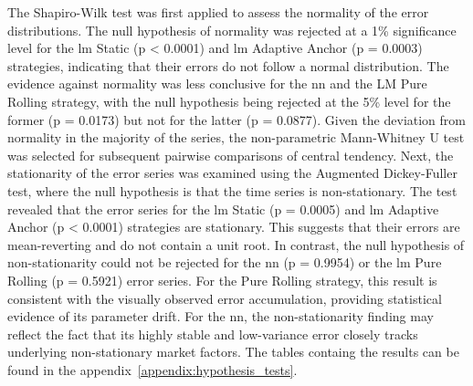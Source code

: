 The Shapiro-Wilk test was first applied to assess the normality of the error distributions. The null hypothesis of normality was rejected at a 1\% significance level for the \ac{lm} Static (p < 0.0001) and \ac{lm} Adaptive Anchor (p = 0.0003) strategies, indicating that their errors do not follow a normal distribution. The evidence against normality was less conclusive for the \ac{nn} and the LM Pure Rolling strategy, with the null hypothesis being rejected at the 5\% level for the former (p = 0.0173) but not for the latter (p = 0.0877). Given the deviation from normality in the majority of the series, the non-parametric Mann-Whitney U test was selected for subsequent pairwise comparisons of central tendency. Next, the stationarity of the error series was examined using the Augmented Dickey-Fuller test, where the null hypothesis is that the time series is non-stationary. The test revealed that the error series for the \ac{lm} Static (p = 0.0005) and \ac{lm} Adaptive Anchor (p < 0.0001) strategies are stationary. This suggests that their errors are mean-reverting and do not contain a unit root. In contrast, the null hypothesis of non-stationarity could not be rejected for the \ac{nn} (p = 0.9954) or the \ac{lm} Pure Rolling (p = 0.5921) error series. For the Pure Rolling strategy, this result is consistent with the visually observed error accumulation, providing statistical evidence of its parameter drift. For the \ac{nn}, the non-stationarity finding may reflect the fact that its highly stable and low-variance error closely tracks underlying non-stationary market factors. The tables containg the results can be found in the appendix~\ref{appendix:hypothesis_tests}.

